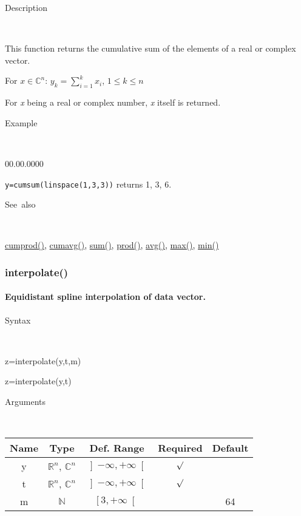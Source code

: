 \begin{description}
\item [Description]~
\end{description}
This function returns the cumulative sum of the elements of a real
or complex vector.

\medskip{}
For $x\in$$\mathbb{C}^{n}$: $y_{k}=$${\displaystyle \sum\limits _{i=1}^{k}x_{i}}$,
$1\leq k\leq n$
\medskip{}

For \textit{x} being a real or complex number, \textit{x} itself is
returned.

\begin{description}
\item [Example]~
\end{description}
\begin{lyxlist}{00.00.0000}
\item [\texttt{y=cumsum(linspace(1,3,3))}]returns 1, 3, 6.
\end{lyxlist}
\begin{description}
\item [See~also]~
\end{description}
\textcolor{blue}{\hyperlink{cumprod}{cumprod()}}\textcolor{black}{,}
\textcolor{blue}{\hyperlink{cumavg}{cumavg()}}\textcolor{black}{,}
\textcolor{blue}{\hyperlink{sum}{sum()}}\textcolor{black}{,} \textcolor{blue}{\hyperlink{prod}{prod()}}\textcolor{black}{,}
\textcolor{blue}{\hyperlink{avg}{avg()}}\textcolor{black}{,} \textcolor{blue}{\hyperlink{max}{max()}}\textcolor{black}{,}
\textcolor{blue}{\hyperlink{min}{min()}}


\newpage
\subsubsection*{\hypertarget{interpolate}{}{\Large interpolate()}}


\paragraph{\label{par:spline-interpolation}Equidistant spline interpolation
of data vector.}

\begin{description}
\item [Syntax]~
\end{description}
z=interpolate(y,t,m)

\noindent z=interpolate(y,t)

\begin{description}
\item [Arguments]~
\end{description}
\begin{tabular}{|c|c|c|c|c|}
\hline 
Name&
Type&
Def. Range&
Required&
Default\tabularnewline
\hline
\hline 
y&
$\mathbb{R}^{n}$, $\mathbb{C}^{n}$&
$\left]-\infty,+\infty\right[$&
$\surd$&
\tabularnewline
\hline
t&
$\mathbb{R}^{n}$, $\mathbb{C}^{n}$&
$\left]-\infty,+\infty\right[$&
$\surd$&
\tabularnewline
\hline
m&
$\mathbb{N}$&
$\left[3,+\infty\right[$&
&
64\tabularnewline
\hline
\end{tabular}

